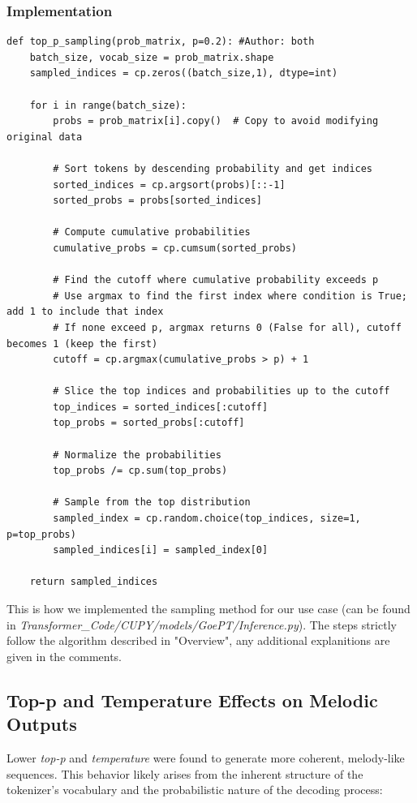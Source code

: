 \documentclass[a4paper,12pt]{extarticle}
\begin{document}
\subsubsection{Implementation}
\begin{lstlisting}
def top_p_sampling(prob_matrix, p=0.2): #Author: both
    batch_size, vocab_size = prob_matrix.shape
    sampled_indices = cp.zeros((batch_size,1), dtype=int)
    
    for i in range(batch_size):
        probs = prob_matrix[i].copy()  # Copy to avoid modifying original data
        
        # Sort tokens by descending probability and get indices
        sorted_indices = cp.argsort(probs)[::-1]
        sorted_probs = probs[sorted_indices]
        
        # Compute cumulative probabilities
        cumulative_probs = cp.cumsum(sorted_probs)
        
        # Find the cutoff where cumulative probability exceeds p
        # Use argmax to find the first index where condition is True; add 1 to include that index
        # If none exceed p, argmax returns 0 (False for all), cutoff becomes 1 (keep the first)
        cutoff = cp.argmax(cumulative_probs > p) + 1
        
        # Slice the top indices and probabilities up to the cutoff
        top_indices = sorted_indices[:cutoff]
        top_probs = sorted_probs[:cutoff]
        
        # Normalize the probabilities
        top_probs /= cp.sum(top_probs)
        
        # Sample from the top distribution
        sampled_index = cp.random.choice(top_indices, size=1, p=top_probs)
        sampled_indices[i] = sampled_index[0]
    
    return sampled_indices
\end{lstlisting}
This is how we implemented the sampling method for our use case (can be found in \textit{Transformer\_Code/CUPY/models/GoePT/Inference.py}). The steps strictly follow the algorithm described in "Overview", any additional explanitions are given in the comments. 
\subsection{Top-p and Temperature Effects on Melodic Outputs}
Lower \textit{top-p} and \textit{temperature} were found to generate more coherent, melody-like sequences. 
This behavior likely arises from the inherent structure of the tokenizer's vocabulary and the probabilistic nature of the decoding process:
\end{document}
